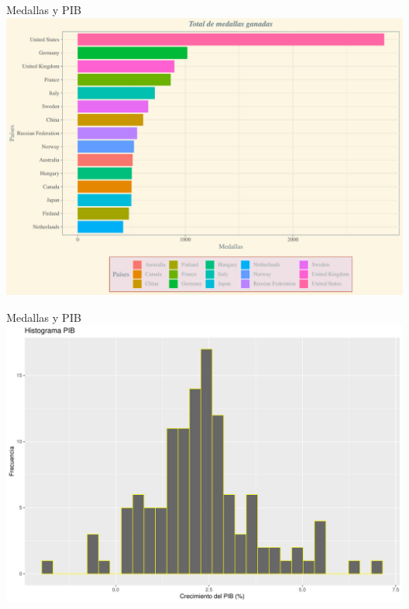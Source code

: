 \documentclass[
  ignorenonframetext,
]{beamer}
\begin{document}
\begin{frame}{Medallas y PIB}
\protect\hypertarget{medallas-y-pib}{}
\includegraphics{Presentacion_files/figure-beamer/unnamed-chunk-9-1.pdf}
\end{frame}

\begin{frame}{Medallas y PIB}
\protect\hypertarget{medallas-y-pib-1}{}
\includegraphics{Presentacion_files/figure-beamer/unnamed-chunk-10-1.pdf}
\end{frame}
\end{document}
